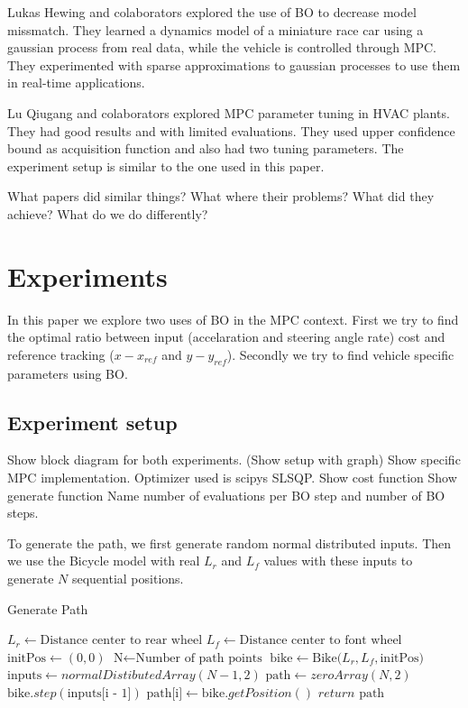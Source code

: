 \documentclass[twoside,twocolumn]{article}
\begin{document}
Lukas Hewing and colaborators \cite{hewing2018cautious} explored the use of BO to decrease model missmatch. They learned a dynamics model of a miniature race car using a gaussian process from real data, while the vehicle is controlled through MPC. They experimented with sparse approximations to gaussian processes to use them in real-time applications.

Lu Qiugang and colaborators \cite{lu2020mpc} explored MPC parameter tuning in HVAC plants. They had good results and with limited evaluations. They used upper confidence bound as acquisition function and also had two tuning parameters. The experiment setup is similar to the one used in this paper.

What papers did similar things?
What where their problems?
What did they achieve?
What do we do differently?

\section{Experiments}

In this paper we explore two uses of BO in the MPC context. First we try to find the optimal ratio between input (accelaration and steering angle rate) cost and reference tracking ($x - x_{ref}$ and $y - y_{ref}$). Secondly we try to find vehicle specific parameters using BO.

\subsection{Experiment setup}
Show block diagram for both experiments. (Show setup with graph)
Show specific MPC implementation. Optimizer used is scipys SLSQP.
Show cost function
Show generate function
Name number of evaluations per BO step and number of BO steps.

To generate the path, we first generate random normal distributed inputs. Then we use the Bicycle model with real $L_r$ and $L_f$ values with these inputs to generate $N$ sequential positions.
\begin{algorithm}
    \caption{Generate Path}
    \label{alg:path_gen}
    \begin{algorithmic}
        \State $L_r \gets \text{Distance center to rear wheel}$
        \State $L_f \gets \text{Distance center to font wheel}$
        \State $\text{initPos} \gets (0,0)$
        \State $\text{N} \gets \text{Number of path points}$
        \State $\text{bike} \gets \text{Bike(}L_r, L_f, \text{initPos}\text{)}$
        \State $\text{inputs} \gets normalDistibutedArray(N - 1, 2)$
        \State $\text{path} \gets zeroArray(N, 2)$
            \State $\text{bike}.step(\text{inputs[i - 1]})$
            \State $\text{path[i]} \gets \text{bike}.getPosition()$
        \EndFor
        \State $return \text{ path}$
    \end{algorithmic}
\end{algorithm}
\end{document}

